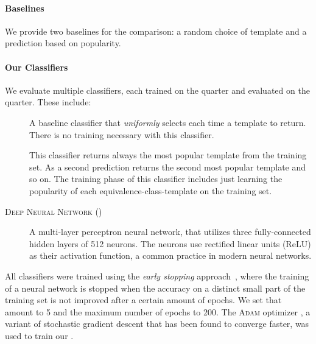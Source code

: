 \paragraph{Baselines}
We provide two baselines for the comparison: a random choice of template and a
prediction based on popularity.

\paragraph{Our Classifiers}
We evaluate multiple classifiers, each trained on the \SPRING quarter and evaluated
on the \FALL quarter. These include:
\begin{description}
  \item[\random] A baseline classifier that \emph{uniformly} selects each time a
    template to return. There is no training necessary with this classifier.
  \item[\popular] This classifier returns always the most popular template from
    the training set. As a second prediction returns the second most popular
    template and so on. The training phase of this classifier includes just
    learning the popularity of each equivalence-class-template on the training
    set.
  \item[\textsc{Deep Neural Network} (\dnn)] A multi-layer perceptron neural
    network, that utilizes three fully-connected hidden layers of 512 neurons.
    The neurons use rectified linear units (ReLU) as their activation function,
    a common practice in modern neural networks.
\end{description}

All classifiers were trained using the \emph{early stopping} approach~\cite{FIXME},
where the
training of a neural network is stopped when the accuracy on a distinct small
part of the training set is not improved after a certain amount of epochs. We
set that amount to 5 and the maximum number of epochs to 200. The \textsc{Adam}
optimizer \citep{Kingma2014-ng}, a variant of stochastic gradient descent that
has been found to converge faster, was used to train our \dnn.



